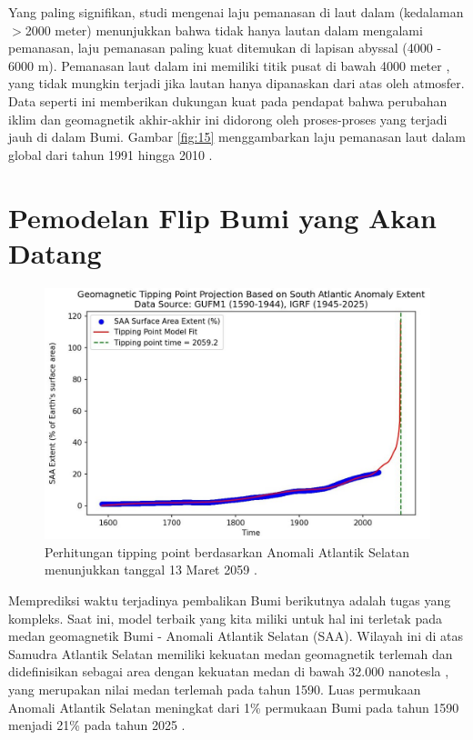 \documentclass[10pt,twocolumn,letterpaper]{article}
\begin{document}
Yang paling signifikan, studi mengenai laju pemanasan di laut dalam (kedalaman $>$2000 meter) menunjukkan bahwa tidak hanya lautan dalam mengalami pemanasan, laju pemanasan paling kuat ditemukan di lapisan abyssal (4000 - 6000 m). Pemanasan laut dalam ini memiliki titik pusat di bawah 4000 meter \cite{132,129}, yang tidak mungkin terjadi jika lautan hanya dipanaskan dari atas oleh atmosfer. Data seperti ini memberikan dukungan kuat pada pendapat bahwa perubahan iklim dan geomagnetik akhir-akhir ini didorong oleh proses-proses yang terjadi jauh di dalam Bumi. Gambar \ref{fig:15} menggambarkan laju pemanasan laut dalam global dari tahun 1991 hingga 2010 \cite{132}.

\section{Pemodelan Flip Bumi yang Akan Datang}
\begin{figure}[b]
\begin{center}
   \includegraphics[width=1\linewidth]{saa-crop.jpeg}
\end{center}
   \caption{Perhitungan tipping point berdasarkan Anomali Atlantik Selatan menunjukkan tanggal 13 Maret 2059 \cite{125,126}.}
\label{fig:16}
\label{fig:onecol}
\end{figure}

Memprediksi waktu terjadinya pembalikan Bumi berikutnya adalah tugas yang kompleks. Saat ini, model terbaik yang kita miliki untuk hal ini terletak pada medan geomagnetik Bumi - Anomali Atlantik Selatan (SAA). Wilayah ini di atas Samudra Atlantik Selatan memiliki kekuatan medan geomagnetik terlemah dan didefinisikan sebagai area dengan kekuatan medan di bawah 32.000 nanotesla \cite{135}, yang merupakan nilai medan terlemah pada tahun 1590. Luas permukaan Anomali Atlantik Selatan meningkat dari 1\% permukaan Bumi pada tahun 1590 menjadi 21\% pada tahun 2025 \cite{136}.
\end{document}
